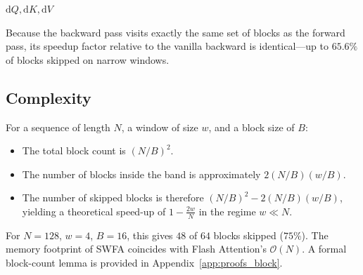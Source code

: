 \begin{algorithm}[h]
    \caption{Sliding Window Flash Attention (backward pass).}
    \label{alg:swfa_backward}
    \Return $\mathrm{d}Q, \mathrm{d}K, \mathrm{d}V$\;
\end{algorithm}

Because the backward pass visits exactly the same set of blocks
as the forward pass, its speedup factor relative to the vanilla
backward is identical---up to $65.6\%$ of blocks skipped on
narrow windows.

\subsection{Complexity}\label{sec:swfa_complexity}
For a sequence of length $N$, a window of size $w$, and a block
size of $B$:
\begin{itemize}
    \item The total block count is $(N/B)^2$.
    \item The number of blocks inside the band is approximately
          $2(N/B)(w/B)$.
    \item The number of skipped blocks is therefore
          $(N/B)^2 - 2(N/B)(w/B)$, yielding a theoretical
          speed-up of $1 - \tfrac{2w}{N}$ in the regime
          $w \ll N$.
\end{itemize}
For $N = 128$, $w = 4$, $B = 16$, this gives $48$ of $64$
blocks skipped ($75\%$). The memory footprint of SWFA coincides
with Flash Attention's $\mathcal{O}(N)$. A formal block-count
lemma is provided in Appendix~\ref{app:proofs_block}.

